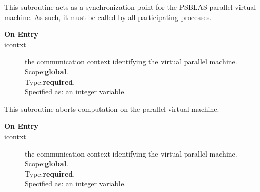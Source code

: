 

This subroutine acts as a synchronization point for  the  PSBLAS
parallel virtual  machine. As such, it must be called by all
participating processes. 
\begin{description}
\item[\bf  On Entry ]
\item[icontxt] the communication context identifying the virtual
  parallel machine.\\
Scope:{\bf global}.\\
Type:{\bf required}.\\
Specified as: an integer variable.
\end{description}




This subroutine aborts computation on the parallel virtual machine. 
\begin{description}
\item[\bf  On Entry ]
\item[icontxt] the communication context identifying the virtual
  parallel machine.\\
Scope:{\bf global}.\\
Type:{\bf required}.\\
Specified as: an integer variable.
\end{description}



%
%


